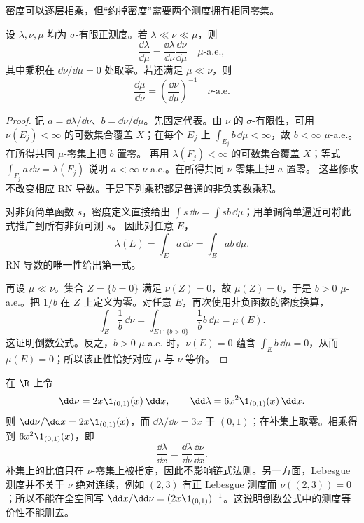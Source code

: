 密度可以逐层相乘，但“约掉密度”需要两个测度拥有相同零集。

\begin{proposition}[RN 链式法则与倒数]\label{proposition:3-3-1-4}
设 $\lambda,\nu,\mu$ 均为 $\sigma$-有限正测度。若
$\lambda\ll\nu\ll\mu$，则
\[
 \frac{\dd\lambda}{\dd\mu}
 =\frac{\dd\lambda}{\dd\nu}\frac{\dd\nu}{\dd\mu}
 \quad\mu\text{-a.e.},
\]
其中乘积在 $\dd\nu/\dd\mu=0$ 处取零。若还满足 $\mu\ll\nu$，则
\[
  \frac{\dd\mu}{\dd\nu}
  =\left(\frac{\dd\nu}{\dd\mu}\right)^{-1}
  \quad\nu\text{-a.e.}
\]
\end{proposition}

\begin{proof}
记 $a=\dd\lambda/\dd\nu$、$b=\dd\nu/\dd\mu$。先固定代表。由 $\nu$ 的 $\sigma$-有限性，可用
$\nu(E_j)<\infty$ 的可数集合覆盖 $X$；在每个 $E_j$ 上
$\int_{E_j}b\,\dd\mu<\infty$，故 $b<\infty$ $\mu$-a.e.。在所得共同 $\mu$-零集上把 $b$ 置零。
再用 $\lambda(F_j)<\infty$ 的可数集合覆盖 $X$；等式
$\int_{F_j}a\,\dd\nu=\lambda(F_j)$ 说明 $a<\infty$ $\nu$-a.e.。在所得共同 $\nu$-零集上把
$a$ 置零。
这些修改不改变相应 RN 导数。于是下列乘积都是普通的非负实数乘积。

对非负简单函数 $s$，密度定义直接给出
$\int s\,\dd\nu=\int sb\,\dd\mu$；用单调简单逼近可将此式推广到所有非负可测 $s$。
因此对任意 $E$，
\[
 \lambda(E)=\int_Ea\,\dd\nu=\int_Eab\,\dd\mu.
\]
RN 导数的唯一性给出第一式。

再设 $\mu\ll\nu$。集合 $Z=\{b=0\}$ 满足 $\nu(Z)=0$，故 $\mu(Z)=0$，于是
$b>0$ $\mu$-a.e.。把 $1/b$ 在 $Z$ 上定义为零。对任意 $E$，再次使用非负函数的密度换算，
\[
 \int_E\frac1b\,\dd\nu
 =\int_{E\cap\{b>0\}}\frac1b b\,\dd\mu
 =\mu(E).
\]
这证明倒数公式。反之，$b>0$ $\mu$-a.e. 时，$\nu(E)=0$ 蕴含
$\int_Eb\,\dd\mu=0$，从而 $\mu(E)=0$；所以该正性恰好对应 $\mu$ 与 $\nu$ 等价。
\end{proof}

\begin{example}[链式密度]\label{ex:3-3-1-3}
在 $\R$ 上令
\[
 \dd\nu=2x\1_{(0,1)}(x)\,\dd x,
 \qquad \dd\lambda=6x^2\1_{(0,1)}(x)\,\dd x.
\]
则 $\dd\nu/\dd x=2x\1_{(0,1)}(x)$，而
$\dd\lambda/\dd\nu=3x$ 于 $(0,1)$；在补集上取零。相乘得到
$6x^2\1_{(0,1)}(x)$，即
\[
  \frac{\dd\lambda}{\dd x}
  =\frac{\dd\lambda}{\dd\nu}\frac{\dd\nu}{\dd x}.
\]
补集上的比值只在 $\nu$-零集上被指定，因此不影响链式法则。另一方面，Lebesgue 测度并不关于
$\nu$ 绝对连续，例如 $(2,3)$ 有正 Lebesgue 测度而 $\nu((2,3))=0$；所以不能在全空间写
$\dd x/\dd\nu=(2x\1_{(0,1)})^{-1}$。这说明倒数公式中的测度等价性不能删去。
\end{example}

